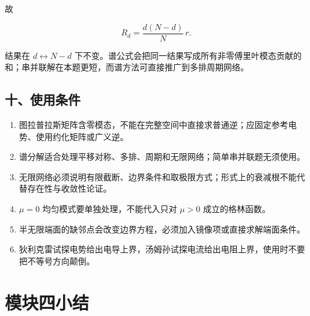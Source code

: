 故

\[
\boxed{R_d=\frac{d(N-d)}N\,r}.
\]

结果在 \(d\leftrightarrow N-d\)
下不变。谱公式会把同一结果写成所有非零傅里叶模态贡献的和；串并联解在本题更短，而谱方法可直接推广到多排周期网络。

\subsection{十、使用条件}\label{m4:ux5341ux4f7fux7528ux6761ux4ef6-2}

\begin{enumerate}
\def\labelenumi{\arabic{enumi}.}
\tightlist
\item
  图拉普拉斯矩阵含零模态，不能在完整空间中直接求普通逆；应固定参考电势、使用约化矩阵或广义逆。
\item
  谱分解适合处理平移对称、多排、周期和无限网络；简单串并联题无须使用。
\item
  无限网络必须说明有限截断、边界条件和取极限方式；形式上的衰减根不能代替存在性与收敛性论证。
\item
  \(\mu=0\) 均匀模式要单独处理，不能代入只对 \(\mu>0\) 成立的格林函数。
\item
  半无限端面的缺邻点会改变边界方程，必须加入镜像项或直接求解端面条件。
\item
  狄利克雷试探电势给出电导上界，汤姆孙试探电流给出电阻上界，使用时不要把不等号方向颠倒。
\end{enumerate}

\section{模块四小结}\label{m4:ux6a21ux5757ux56dbux5c0fux7ed3}

